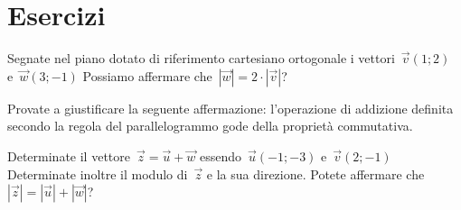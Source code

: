 
\section{Esercizi}

% 


\begin{esercizio}
\label{ese:vett.1}
Segnate nel piano dotato di riferimento cartesiano ortogonale i 
vettori~\(\vec{v}(1;2)\) e~\(\vec{w}(3;-1)\) Possiamo affermare che~\(|\vec{w}|=2 
\cdot |\vec{v}|\)?
\end{esercizio}

\begin{esercizio}
\label{ese:vett.2}
Provate a giustificare la seguente affermazione: l'operazione di addizione 
definita secondo la regola del parallelogrammo gode della proprietà commutativa.
\end{esercizio}

\begin{esercizio}
\label{ese:vett.3}
Determinate il vettore~\(\vec{z}=\vec{u}+\vec{w}\) essendo~\(\vec{u}(-1;-3)\) 
e~\(\vec{v}(2;-1)\) Determinate inoltre il modulo di~\(\vec{z}\) e la sua direzione.
Potete affermare che~\(|\vec{z}|=|\vec{u}|+|\vec{w}|\)?
\end{esercizio}

